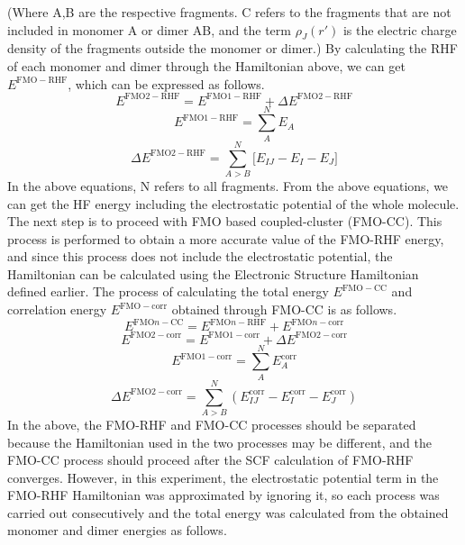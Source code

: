 \documentclass[pdflatex,sn-mathphys-num]{sn-jnl}%
\theoremstyle{thmstyleone}%
\theoremstyle{thmstyletwo}%
\theoremstyle{thmstylethree}%
\begin{document}
(Where A,B are the respective fragments. C refers to the fragments that are not included in monomer A or dimer AB, and the term \(\rho_J(r')\) is the electric charge density of the fragments outside the monomer or dimer.) By calculating the RHF of each monomer and dimer through the Hamiltonian above, we can get \({E^\mathrm{FMO-RHF}}\), which can be expressed as follows.
\begin{equation}
E^{\mathrm{FMO2\!-\!RHF}} = E^{\mathrm{FMO1\!-\!RHF}} + \Delta E^{\mathrm{FMO2\!-\!RHF}}
\end{equation}
\begin{equation}
E^{\mathrm{FMO1\!-\!RHF}} = \sum_{A}^{N} E_A
\end{equation}
\begin{equation}
\Delta E^{\mathrm{FMO2\!-\!RHF}} = \sum_{A > B}^{N} \Big[ E_{IJ} - E_I - E_J \Big]
\end{equation}
In the above equations, N refers to all fragments. From the above equations, we can get the HF energy including the electrostatic potential of the whole molecule. The next step is to proceed with FMO based coupled-cluster (FMO-CC). This process is performed to obtain a more accurate value of the FMO-RHF energy, and since this process does not include the electrostatic potential, the Hamiltonian can be calculated using the Electronic Structure Hamiltonian defined earlier. The process of calculating the total energy \(E^\mathrm{FMO-CC}\) and correlation energy \(E^\mathrm{FMO-corr}\) obtained through FMO-CC is as follows.
\begin{equation}
E^{\mathrm{FMO}n\!-\!\mathrm{CC}} = E^{\mathrm{FMO}n\!-\!\mathrm{RHF}} + E^{\mathrm{FMO}n\!-\!\mathrm{corr}}
\end{equation}
\begin{equation}
E^{\mathrm{FMO2\!-\!corr}} = E^{\mathrm{FMO1\!-\!corr}} + \Delta E^{\mathrm{FMO2\!-\!corr}}
\end{equation}
\begin{equation}
E^{\mathrm{FMO1\!-\!corr}} = \sum_{A}^{N} E_A^{\mathrm{corr}}
\end{equation}
\begin{equation}
\Delta E^{\mathrm{FMO2\!-\!corr}} = \sum_{A>B}^{N} 
\left( E_{IJ}^{\mathrm{corr}} - E_I^{\mathrm{corr}} - E_J^{\mathrm{corr}} \right)
\end{equation}
In the above, the FMO-RHF and FMO-CC processes should be separated because the Hamiltonian used in the two processes may be different, and the FMO-CC process should proceed after the SCF calculation of FMO-RHF converges. However, in this experiment, the electrostatic potential term in the FMO-RHF Hamiltonian was approximated by ignoring it, so each process was carried out consecutively and the total energy was calculated from the obtained monomer and dimer energies as follows.
\end{document}
